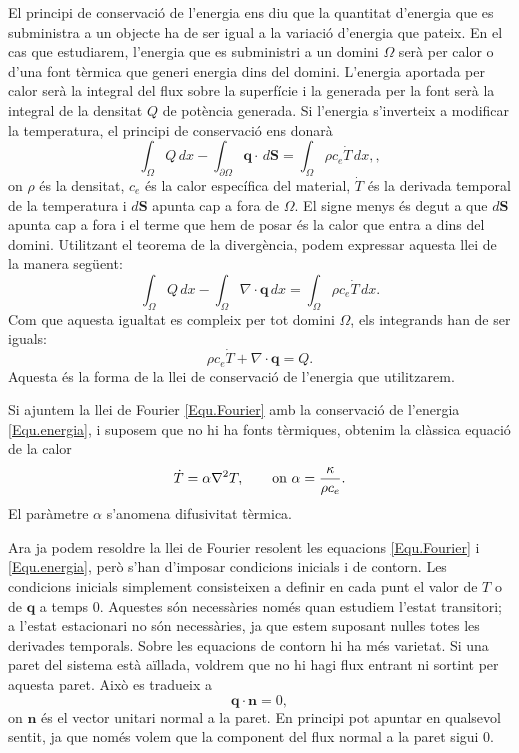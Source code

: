 \documentclass{article}
\begin{document}
El principi de conservaci\'{o} de l'energia ens diu que la quantitat d'energia que es subministra a un objecte ha de ser igual a la variaci\'{o} d'energia que pateix. En el cas que estudiarem, l'energia que es subministri a un domini $\Omega$ ser\`{a} per calor o d'una font t\`{e}rmica que generi energia dins del domini. L'energia aportada per calor ser\`{a} la integral del flux sobre la superf\'{i}cie i la generada per la font ser\`{a} la integral de la densitat $Q$ de pot\`{e}ncia generada. Si l'energia s'inverteix a modificar la temperatura, el principi de conservaci\'{o} ens donar\`{a}
\[\int_{\Omega}Q\,dx-\int_{\partial\Omega}\boldsymbol{q}\cdot\,d\boldsymbol{S}=\int_{\Omega}\rho c_e\dot T\,dx,,\]
on $\rho$ \'{e}s la densitat, $c_e$ \'{e}s la calor espec\'{i}fica del material, $\dot T$ \'{e}s la derivada temporal de la temperatura i $d\boldsymbol{S}$ apunta cap a fora de $\Omega$. El signe menys \'{e}s degut a que $d\boldsymbol{S}$ apunta cap a fora i el terme que hem de posar \'{e}s la calor que entra a dins del domini. Utilitzant el teorema de la diverg\`{e}ncia, podem expressar aquesta llei de la manera seg\"{u}ent:
\[\int_{\Omega}Q\,dx-\int_{\Omega}\nabla\cdot\boldsymbol{q}\,dx=\int_{\Omega}\rho c_e\dot T\,dx.\]
Com que aquesta igualtat es compleix per tot domini $\Omega$, els integrands han de ser iguals:
\begin{equation}\label{Equ.energia}
\rho c_e\dot T+\nabla\cdot\boldsymbol{q}=Q.
\end{equation}
Aquesta \'{e}s la forma de la llei de conservaci\'{o} de l'energia que utilitzarem.

Si ajuntem la llei de Fourier \eqref{Equ.Fourier} amb la conservaci\'{o} de l'energia \eqref{Equ.energia}, i suposem que no hi ha fonts t\`{e}rmiques, obtenim la cl\`{a}ssica equaci\'{o} de la calor
\begin{equation}\label{Equ.calor}
\dot T=\alpha\nabla^2T,\hspace{7mm}\text{on }\alpha=\frac\kappa{\rho c_e}.
\end{equation}
El par\`{a}metre $\alpha$ s'anomena difusivitat t\`{e}rmica.

Ara ja podem resoldre la llei de Fourier resolent les equacions \eqref{Equ.Fourier} i \eqref{Equ.energia}, per\`{o} s'han d'imposar condicions inicials i de contorn. Les condicions inicials simplement consisteixen a definir en cada punt el valor de $T$ o de $\boldsymbol{q}$ a temps 0. Aquestes s\'{o}n necess\`{a}ries nom\'{e}s quan estudiem l'estat transitori; a l'estat estacionari no s\'{o}n necess\`{a}ries, ja que estem suposant nul\textperiodcentered les totes les derivades temporals. Sobre les equacions de contorn hi ha m\'{e}s varietat. Si una paret del sistema est\`{a} a\"{i}llada, voldrem que no hi hagi flux entrant ni sortint per aquesta paret. Aix\`{o} es tradueix a
\begin{equation}\label{Equ.aillament}
\boldsymbol{q}\cdot\boldsymbol{n}=0,
\end{equation}
on $\boldsymbol{n}$ \'{e}s el vector unitari normal a la paret. En principi pot apuntar en qualsevol sentit, ja que nom\'{e}s volem que la component del flux normal a la paret sigui 0.
\end{document}
